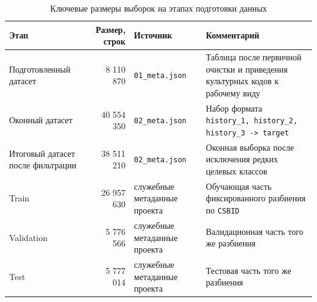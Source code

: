 \begin{table}[htbp]
\centering
\small
\caption{Ключевые размеры выборок на этапах подготовки данных}
\label{tab:practice-data-sizes}
\begin{tabularx}{0.96\textwidth}{L{0.27\textwidth} r L{0.20\textwidth} X}
\toprule
Этап & Размер, строк & Источник & Комментарий \\
\midrule
Подготовленный датасет & 8 110 870 & \texttt{01\_meta.json} & Таблица после первичной очистки и приведения культурных кодов к рабочему виду \\
Оконный датасет & 40 554 350 & \texttt{02\_meta.json} & Набор формата \texttt{history\_1, history\_2, history\_3 -> target} \\
Итоговый датасет после фильтрации & 38 511 210 & \texttt{02\_meta.json} & Оконная выборка после исключения редких целевых классов \\
Train & 26 957 630 & служебные метаданные проекта & Обучающая часть фиксированного разбиения по \texttt{CSBID} \\
Validation & 5 776 566 & служебные метаданные проекта & Валидационная часть того же разбиения \\
Test & 5 777 014 & служебные метаданные проекта & Тестовая часть того же разбиения \\
\bottomrule
\end{tabularx}
\end{table}
